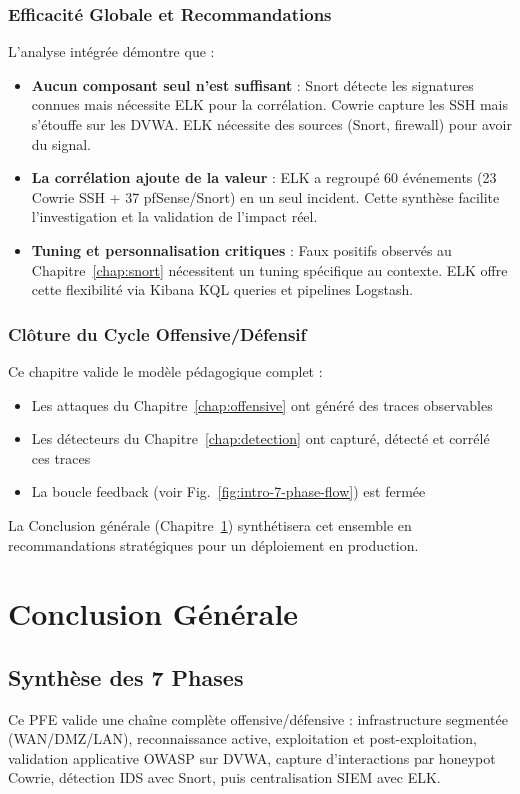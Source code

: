 \documentclass[12pt,a4paper,openany]{report}
\begin{document}
	\subsection{Efficacité Globale et Recommandations}
	
	L'analyse intégrée démontre que :
	
	\begin{itemize}
		\item \textbf{Aucun composant seul n'est suffisant} : Snort détecte les signatures connues mais nécessite ELK pour la corrélation. Cowrie capture les SSH mais s'étouffe sur les DVWA. ELK nécessite des sources (Snort, firewall) pour avoir du signal.
		\item \textbf{La corrélation ajoute de la valeur} : ELK a regroupé 60 événements (23 Cowrie SSH + 37 pfSense/Snort) en un seul incident. Cette synthèse facilite l'investigation et la validation de l'impact réel.
		\item \textbf{Tuning et personnalisation critiques} : Faux positifs observés au Chapitre~\ref{chap:snort} nécessitent un tuning spécifique au contexte. ELK offre cette flexibilité via Kibana KQL queries et pipelines Logstash.
	\end{itemize}
	
	\subsection{Clôture du Cycle Offensive/Défensif}
	
	Ce chapitre valide le modèle pédagogique complet :
	\begin{itemize}
		\item Les attaques du Chapitre~\ref{chap:offensive} ont généré des traces observables
		\item Les détecteurs du Chapitre~\ref{chap:detection} ont capturé, détecté et corrélé ces traces
		\item La boucle feedback (voir Fig.~\ref{fig:intro-7-phase-flow}) est fermée
	\end{itemize}
	
	La Conclusion générale (Chapitre~\ref{chap:conclusion}) synthétisera cet ensemble en recommandations stratégiques pour un déploiement en production.
	
	\chapter{Conclusion Générale}
	\label{chap:conclusion}
	
	\section{Synthèse des 7 Phases}
	Ce PFE valide une chaîne complète offensive/défensive : infrastructure segmentée (WAN/DMZ/LAN), reconnaissance active, exploitation et post-exploitation, validation applicative OWASP sur DVWA, capture d'interactions par honeypot Cowrie, détection IDS avec Snort, puis centralisation SIEM avec ELK.
	
\end{document}
